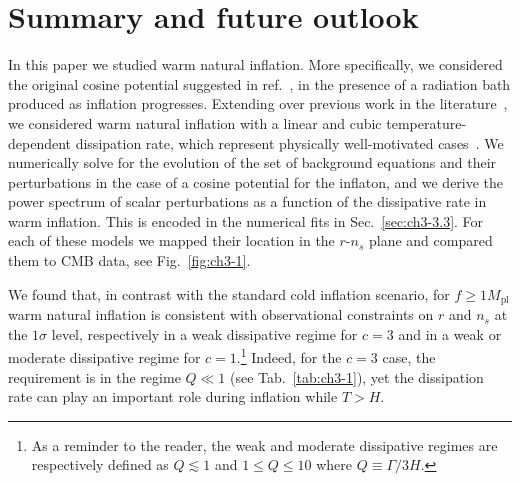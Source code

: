 \section{Summary and future outlook \label{sec:ch3-5}}

In this paper we studied warm natural inflation. More specifically, we considered the original cosine potential suggested in ref.~\cite{Freese:1990rb}, in the presence of a radiation bath produced as inflation progresses. Extending over previous work in the literature~\cite{Visinelli:2011jy, Reyimuaji:2020bkm, Correa:2022ngq}, we considered warm natural inflation with a linear and cubic temperature-dependent dissipation rate, which represent physically well-motivated cases~\cite{Berghaus:2019whh, Berghaus:2020ekh, DeRocco:2021rzv}. We numerically solve for the evolution of the set of background equations and their perturbations in the case of a cosine potential for the inflaton, and we derive the power spectrum of scalar perturbations as a function of the dissipative rate in warm inflation. This is encoded in the numerical fits in Sec.~\ref{sec:ch3-3.3}. For each of these models we mapped their location in the $r$-$n_s$ plane and compared them to CMB data, see Fig.~\ref{fig:ch3-1}.

We found that, in contrast with the standard cold inflation scenario, for $f\geq 1 M_\mathrm{pl}$ warm natural inflation is consistent with observational constraints on $r$ and $n_s$ at the $1\sigma$ level, respectively in a weak dissipative regime for $c=3$ and in a weak or moderate dissipative regime for $c=1$.\footnote{As a reminder to the reader, the weak and moderate dissipative regimes are respectively defined as $Q\lesssim1$ and $1\leq Q\leq 10$ where $Q \equiv \Gamma/3H$.} Indeed, for the $c=3$ case, the requirement is in the regime $Q\ll 1$ (see Tab.~\ref{tab:ch3-1}), yet the dissipation rate can play an important role during inflation while $T>H$.

